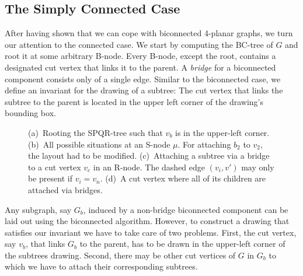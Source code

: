 \documentclass[a4paper,twoside,11pt]{article}
\begin{document}
\subsection{The Simply Connected Case}
\label{sec:4con}
After having shown that we can cope with biconnected 4-planar
graphs, we turn our attention to the connected case. We start by
computing the BC-tree of $G$ and root it at some arbitrary B-node.
Every B-node, except the root, contains a designated cut vertex that
links it to the parent. A \emph{bridge} for a biconnected component
consists only of a single edge. Similar to the biconnected case, we
define an invariant for the drawing of a subtree: The cut vertex
that links the subtree to the parent is located in the upper left
corner of the drawing's bounding box.

\begin{figure}[t]
    \centering
    \begin{minipage}[b]{.24\textwidth}
        \centering
        \subfloat[\label{fig:4p_bc_root}{}]
        {\texttt{[image: 4p\_bc]}}
    \end{minipage}
    \begin{minipage}[b]{.24\textwidth}
        \centering
        \subfloat[\label{fig:4p_bc_Snode}{}]
        {\texttt{[image: 4p\_bc]}}
    \end{minipage}
    \begin{minipage}[b]{.24\textwidth}
        \centering
        \subfloat[\label{fig:4p_bc_Rnode}{}]
        {\texttt{[image: 4p\_bc]}}
    \end{minipage}
    \begin{minipage}[b]{.24\textwidth}
        \centering
        \subfloat[\label{fig:4p_bc_bridges}{}]
        {\texttt{[image: 4p\_bc]}}
    \end{minipage}
    \caption{
    (a)~Rooting the SPQR-tree such that $v_b$ is in the upper-left corner.
    (b)~All possible situations at an S-node $\mu$. For attaching $b_2$ to $v_2$, the layout had to be modified.
    (c)~Attaching a subtree via a bridge to a cut vertex $v_c$ in an R-node. The dashed edge $(v_i, v')$ may only be present if $v_i = v_n$.
    (d)~A cut vertex where all of its children are attached via bridges.}
\end{figure}

Any subgraph, say $G_b$, induced by a non-bridge biconnected
component can be laid out using the biconnected algorithm. However,
to construct a drawing that satisfies our invariant we have to take
care of two problems. First, the cut vertex, say $v_b$, that links
$G_b$ to the parent, has to be drawn in the upper-left corner of the
subtrees drawing. Second, there may be other cut vertices of $G$ in
$G_b$ to which we have to attach their corresponding subtrees.
\end{document}
